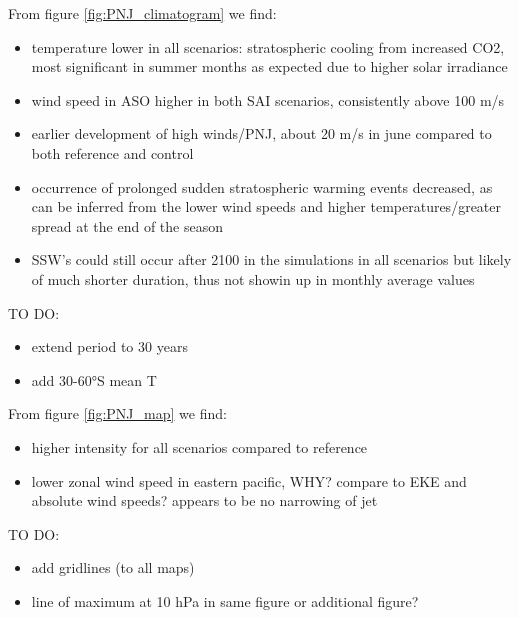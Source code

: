 From figure \ref{fig:PNJ_climatogram} we find:
\begin{itemize}
    \item temperature lower in all scenarios: stratospheric cooling from increased CO2, most significant in summer months as expected due to higher solar irradiance
    \item wind speed in ASO higher in both SAI scenarios, consistently above 100 m/s
    \item earlier development of high winds/PNJ, about 20 m/s in june compared to both reference and control
    \item occurrence of prolonged sudden stratospheric warming events decreased, as can be inferred from the lower wind speeds and higher temperatures/greater spread at the end of the season
    \item SSW's could still occur after 2100 in the simulations in all scenarios but likely of much shorter duration, thus not showin up in monthly average values
\end{itemize}
TO DO:
\begin{itemize}
    \item extend period to 30 years
    \item add 30-60°S mean T
\end{itemize}

From figure \ref{fig:PNJ_map} we find:
\begin{itemize}
    \item higher intensity for all scenarios compared to reference
    \item lower zonal wind speed in eastern pacific, WHY? compare to EKE and absolute wind speeds? appears to be no narrowing of jet
\end{itemize}
TO DO:
\begin{itemize}
    \item add gridlines (to all maps)
    \item line of maximum at 10 hPa in same figure or additional figure?
\end{itemize}

